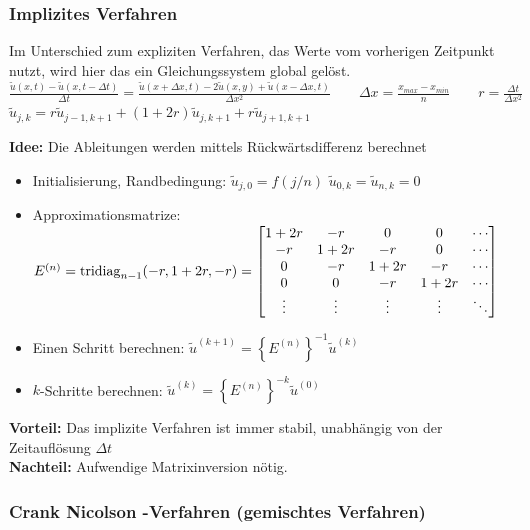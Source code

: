 \subsubsection{Implizites Verfahren}
Im Unterschied zum expliziten Verfahren, das Werte vom vorherigen Zeitpunkt nutzt, wird hier das ein Gleichungssystem global gelöst.\\

$\boxed{\frac{\tilde{u}(x,t) - \tilde{u}(x,t -\Delta t)}{\Delta t} = 
\frac{\tilde{u}(x+\Delta x, t)-2\tilde{u}(x,y) + \tilde{u}( x - \Delta x, t )} {\Delta x^2}}
 \qquad \Delta x=\frac{x_{max}-x_{min}}{n} \qquad \boxed{r=\frac{\Delta
t}{\Delta x^2}}$\\

$ \tilde{u}_{j,k} = r \tilde{u}_{j-1,k+1} + (1+2r)\tilde{u}_{j,k+1} + r \tilde{u}_{j+1,k+1}$

\textbf{Idee:} Die Ableitungen werden mittels Rückwärtsdifferenz berechnet\\


\begin{itemize}
\item Initialisierung, Randbedingung: $\tilde{u}_{j,0}=f(j/n)$ \qquad $\tilde{u}_{0,k}=\tilde{u}_{n,k}=0$
\item Approximationsmatrize: $E^{(n)}=\operatorname{tridiag}_{n-1}(-r,1+2r,-r)=\begin{bmatrix}
1+2r& -r		& 0		& 0 	&\cdots\\
-r	& 1+2r  & -r		& 0		&\cdots\\
0	& -r		& 1+2r 	& -r 	&\cdots\\
0	& 0		& -r		& 1+2r 	&\cdots\\
\vdots&	\vdots&\vdots&\vdots&\ddots	
\end{bmatrix}$ 
\item Einen Schritt berechnen: $\tilde{u}^{(k+1)}=\left\{E^{(n)}\right\}^{-1} \tilde{u}^{(k)}$
\item $k$-Schritte berechnen: $\tilde{u}^{(k)}=\left\{E^{(n)}\right\}^{\bm{-}k} \tilde{u}^{(0)}$
\end{itemize}

\textbf{Vorteil:} Das implizite Verfahren ist immer stabil, unabhängig von der Zeitauflösung $\Delta t$\\
\textbf{Nachteil:} Aufwendige Matrixinversion nötig.

\subsubsection{Crank Nicolson -Verfahren (gemischtes Verfahren)}

